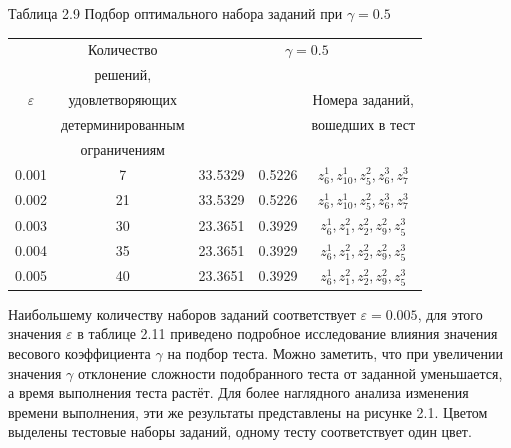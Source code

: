 \documentclass[14pt, a4paper]{extarticle}
\numberwithin{equation}{section}
\begin{document}
{\begin{table}[h!]
\centering
\begin{flushright}
Таблица 2.9 Подбор оптимального набора заданий при $\gamma=0.5$
\end{flushright}
\begin{tabular}{|c|c|c|c|c|}
\hline
            	& Количество        & \multicolumn{3}{c|}{$\gamma = 0.5$}	                        					 \\ \cline{3-5}
				& решений,          & \multirow{4}{80pt}{\centering{Значение квантили $\varphi^\ast$ (минуты)}}	&\multirow{4}{60pt}{\centering{Значение критерия $\psi^\ast$}} &   			 \\
$\varepsilon$	& удовлетворяющих	&               &       				& Номера заданий,						 \\
				& детерминированным	&               &       				& вошедших в тест  						 \\
				& ограничениям		&       		&           			&                 						 \\ \cline{1-5}
0.001			& 7			        & 33.5329		& 0.5226				& $z^1_6, z^1_{10}, z^2_5, z^3_6, z^3_7	$ \\ \cline{1-5}
0.002			& 21		        & 33.5329		& 0.5226				& $z^1_6, z^1_{10}, z^2_5, z^3_6, z^3_7	$ \\ \cline{1-5}
0.003			& 30		        & 23.3651		& 0.3929        		& $z^1_6, z^2_1, z^2_2, z^2_9, z^3_5$	  \\ \cline{1-5}
0.004			& 35		        & 23.3651		& 0.3929        		& $z^1_6, z^2_1, z^2_2, z^2_9, z^3_5$     \\ \cline{1-5}
0.005			& 40		        & 23.3651		& 0.3929        		& $z^1_6, z^2_1, z^2_2, z^2_9, z^3_5$	  \\ \cline{1-5}
\end{tabular}
\label{ch2}
\end{table}

Наибольшему количеству наборов заданий соответствует $\varepsilon=0.005$, для этого значения $\varepsilon$ в таблице 2.11 приведено подробное исследование влияния значения весового коэффициента $\gamma$ на подбор теста. Можно заметить, что при увеличении значения $\gamma$ отклонение сложности подобранного теста от заданной уменьшается, а время выполнения теста растёт. Для более наглядного анализа изменения времени выполнения, эти же результаты представлены на рисунке 2.1. Цветом выделены тестовые наборы заданий, одному тесту соответствует один цвет.

}
\end{document}
